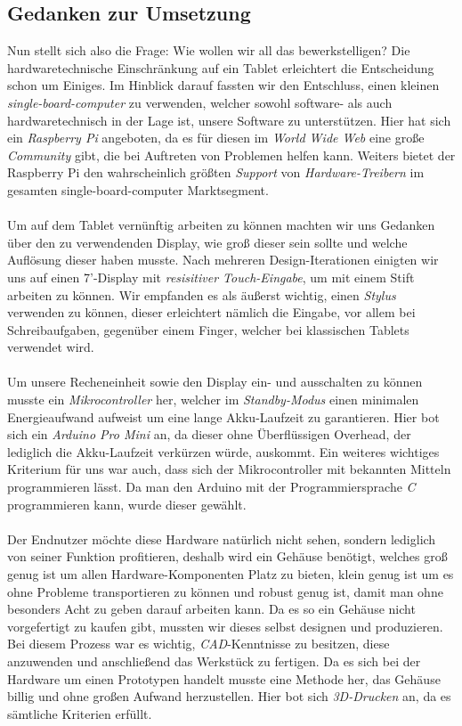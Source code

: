 \subsection{Gedanken zur Umsetzung}
Nun stellt sich also die Frage: Wie wollen wir all das bewerkstelligen? Die hardwaretechnische Einschränkung auf ein Tablet erleichtert die Entscheidung schon um Einiges. Im Hinblick darauf fassten wir den Entschluss, einen kleinen \textit{single-board-computer} zu verwenden, welcher sowohl software- als auch hardwaretechnisch in der Lage ist, unsere Software zu unterstützen. Hier hat sich ein \textit{Raspberry Pi} angeboten, da es für diesen im \textit{World Wide Web} eine große \textit{Community} gibt, die bei Auftreten von Problemen helfen kann. Weiters bietet der Raspberry Pi den wahrscheinlich größten \textit{Support} von \textit{Hardware-Treibern} im gesamten single-board-computer Marktsegment.\\
\\
Um auf dem Tablet vernünftig arbeiten zu können machten wir uns Gedanken über den zu verwendenden Display, wie groß dieser sein sollte und welche Auflösung dieser haben musste. Nach mehreren Design-Iterationen einigten wir uns auf einen 7'-Display mit \textit{resisitiver Touch-Eingabe}, um mit einem Stift arbeiten zu können. Wir empfanden es als äußerst wichtig, einen \textit{Stylus} verwenden zu können, dieser erleichtert nämlich die Eingabe, vor allem bei Schreibaufgaben, gegenüber einem Finger, welcher bei klassischen Tablets verwendet wird.\\
\\
Um unsere Recheneinheit sowie den Display ein- und ausschalten zu können musste ein \textit{Mikrocontroller} her, welcher im \textit{Standby-Modus} einen minimalen Energieaufwand aufweist um eine lange Akku-Laufzeit zu garantieren. Hier bot sich ein \textit{Arduino Pro Mini} an, da dieser ohne Überflüssigen Overhead, der lediglich die Akku-Laufzeit verkürzen würde, auskommt. Ein weiteres wichtiges Kriterium für uns war auch, dass sich der Mikrocontroller mit bekannten Mitteln programmieren lässt. Da man den Arduino mit der Programmiersprache \textit{C} programmieren kann, wurde dieser gewählt.\\
\\
Der Endnutzer möchte diese Hardware natürlich nicht sehen, sondern lediglich von seiner Funktion profitieren, deshalb wird ein Gehäuse benötigt, welches groß genug ist um allen Hardware-Komponenten Platz zu bieten, klein genug ist um es ohne Probleme transportieren zu können und robust genug ist, damit man ohne besonders Acht zu geben darauf arbeiten kann. Da es so ein Gehäuse nicht vorgefertigt zu kaufen gibt, mussten wir dieses selbst designen und produzieren. Bei diesem Prozess war es wichtig, \textit{CAD}-Kenntnisse zu besitzen, diese anzuwenden und anschließend das Werkstück zu fertigen. Da es sich bei der Hardware um einen Prototypen handelt musste eine Methode her, das Gehäuse billig und ohne großen Aufwand herzustellen. Hier bot sich \textit{3D-Drucken} an, da es sämtliche Kriterien erfüllt.\\

